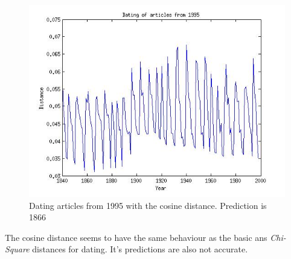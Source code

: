 \begin{figure}[H]
\begin{minipage}[b]{0.3\linewidth}
	\includegraphics[scale=0.25]{Pictures/date_articles/cos/dating1995_corrected.jpg}
        \caption{Dating articles from 1995 with the cosine distance. Prediction is 1866}
        \label{date_cos}
    \end{minipage}
\end{figure}
The cosine distance seems to have the same behaviour as the basic ans \emph{Chi-Square} distances for dating. It's predictions are also not accurate.